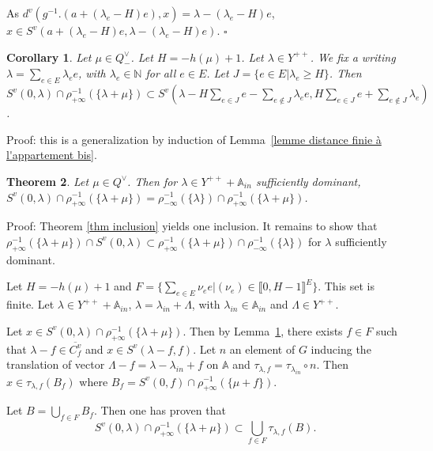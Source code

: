 \documentclass[12pt]{article}
\theoremstyle{plain}
\newtheorem{thm}{Theorem}[section] %
\newtheorem{cor}[thm]{Corollary}
\theoremstyle{definition}
\newcommand{\A}{\mathbb{A}}
\newcommand{\N}{\mathbb{N}}
\begin{document}
As $d^v(g^{-1}.(a+(\lambda_e-H)e),x)=\lambda-(\lambda_e-H)e$, $x\in S^v(a+(\lambda_e -H)e,\lambda-(\lambda_e-H)e)$. $\square$
 
 
 
\begin{cor}\label{lemme majoration du cardinal des boules}
 Let $\mu \in Q^\vee_-$. Let $H=-h(\mu)+1$. Let $\lambda\in Y^{++}$. We fix a writing  $\lambda=\sum_{e\in E}\lambda_e e$, with $\lambda_e\in \N$ for all $e\in E$. Let $J=\{e\in E | \lambda_e \geq H\}$. Then $S^v(0,\lambda)\cap \rho_{+\infty}^{-1}(\{\lambda+\mu\})\subset S^v(\lambda-H\sum_{e\in J} e-\sum_{e\notin J}\lambda_e e, H\sum_{e\in J}e+\sum_{e\notin J}\lambda_ e)$. 
\end{cor}
 
Proof: this is a generalization by induction of Lemma~\ref{lemme distance finie à l'appartement bis}.


    
 \begin{thm}\label{thm égalité des ensembles bis}
 Let $\mu\in Q^\vee$. Then for $\lambda\in Y^{++}+\A_{in}$ sufficiently dominant, $S^v(0,\lambda)\cap \rho_{+\infty}^{-1}(\{\lambda+\mu\})=\rho_{-\infty}^{-1}(\{\lambda\})\cap\rho_{+\infty}^{-1}(\{\lambda+\mu\})$.
 \end{thm}
 
 
Proof: Theorem \ref{thm inclusion} yields one inclusion. It remains to show that $\rho_{+\infty}^{-1}(\{\lambda+\mu\})\cap S^v(0,\lambda)\subset\rho_{+\infty}^{-1}(\{\lambda+\mu\})\cap \rho_{-\infty}^{-1}(\{\lambda\})$ 
for $\lambda$ sufficiently dominant.

\vspace{3mm}
Let $H=-h(\mu)+1$ and $F=\{\sum_{e\in E}\nu_e e|(\nu_e)\in \llbracket 0,H-1\rrbracket^E\}$. This set is finite. Let $\lambda\in Y^{++}+\A_{in}$, $\lambda=\lambda_{in}+\Lambda$, with $\lambda_{in}\in \A_{in}$ and $\Lambda\in Y^{++}$.

Let $x\in S^v(0,\lambda)\cap \rho_{+\infty}^{-1}(\{\lambda+\mu\})$. Then by Lemma~\ref{lemme majoration du cardinal des boules}, there exists $f\in F$ such that $\lambda-f\in \overline{C^v_f}$ and $x\in S^v(\lambda-f,f)$. Let $n$ an element of $G$ inducing the translation of vector $\Lambda-f=\lambda-\lambda_{in}+f$ on $\A$ and $\tau_{\lambda,f}=\tau_{\lambda_{in}}\circ n$. Then $x\in\tau_{\lambda,f}(B_f)$ where $B_f=S^v(0,f)\cap \rho_{+\infty}^{-1}(\{\mu +f\})$.

Let $B=\bigcup_{f\in F}B_f$. Then one has proven that \[S^v(0,\lambda)\cap \rho_{+\infty}^{-1}(\{\lambda+\mu\})\subset \bigcup_{f\in F}\tau_{\lambda,f}(B).\]
\end{document}
